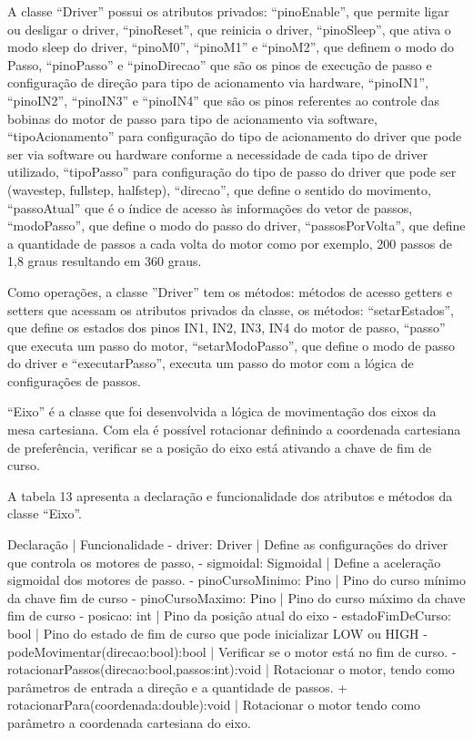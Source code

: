 A classe “Driver” possui os atributos privados: “pinoEnable”, que permite ligar ou desligar o driver, “pinoReset”, 
que reinicia o driver, “pinoSleep”, que ativa o modo sleep do driver, “pinoM0”, “pinoM1” e “pinoM2”, que definem 
o modo do Passo, “pinoPasso” e “pinoDirecao” que são os pinos de execução de passo e configuração de direção para 
tipo de acionamento via hardware, “pinoIN1”, “pinoIN2”, “pinoIN3” e “pinoIN4” que são os pinos referentes ao controle 
das bobinas do motor de passo para tipo de acionamento via software, “tipoAcionamento” para configuração do tipo 
de acionamento do driver que pode ser via software ou hardware conforme a necessidade de cada tipo de driver utilizado, 
“tipoPasso” para configuração do tipo de passo do driver que pode ser (wavestep, fullstep, halfstep), “direcao”, 
que define o sentido do movimento, “passoAtual” que é o índice de acesso às informações do vetor de passos, “modoPasso”, 
que define o modo do passo do driver, “passosPorVolta”, que define a quantidade de passos a cada volta do motor como 
por exemplo, 200 passos de 1,8 graus resultando em 360 graus. 

Como operações, a classe ”Driver” tem os métodos: métodos de acesso getters e setters que acessam os atributos privados 
da classe, os métodos: “setarEstados”, que define os estados dos pinos IN1, IN2, IN3, IN4 do motor de passo, “passo” 
que executa um passo do motor, “setarModoPasso”, que define o modo de passo do driver e “executarPasso”, executa 
um passo do motor com a lógica de configurações de passos.

“Eixo” é a classe que foi desenvolvida a lógica de movimentação dos eixos da mesa cartesiana. Com ela é possível 
rotacionar definindo a coordenada cartesiana de preferência, verificar se a posição do eixo está ativando a chave 
de fim de curso.

A tabela 13 apresenta a declaração e funcionalidade dos atributos e métodos da classe “Eixo”.


Declaração | Funcionalidade
- driver: Driver | Define as configurações do driver que controla os motores de passo,
- sigmoidal: Sigmoidal | Define a aceleração sigmoidal dos motores de passo.
- pinoCursoMinimo: Pino | Pino do curso mínimo da chave fim de curso
- pinoCursoMaximo: Pino | Pino do curso máximo da chave fim de curso
- posicao: int | Pino da posição atual do eixo
- estadoFimDeCurso: bool | Pino do estado de fim de curso que pode inicializar LOW ou HIGH
- podeMovimentar(direcao:bool):bool | Verificar se o motor está no fim de curso.
- rotacionarPassos(direcao:bool,passos:int):void | Rotacionar o motor, tendo como parâmetros de entrada a direção e a quantidade de passos.
+ rotacionarPara(coordenada:double):void | Rotacionar o motor tendo como parâmetro a coordenada cartesiana do eixo.

